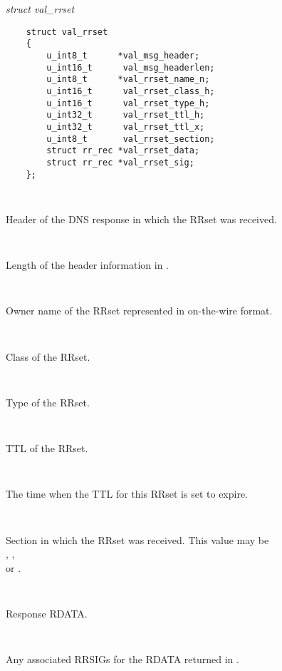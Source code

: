 \begin{description}

\item {\it struct val\_rrset}\verb" "

\begin{verbatim}
    struct val_rrset
    {
        u_int8_t      *val_msg_header;
        u_int16_t      val_msg_headerlen;
        u_int8_t      *val_rrset_name_n;
        u_int16_t      val_rrset_class_h;
        u_int16_t      val_rrset_type_h;
        u_int32_t      val_rrset_ttl_h;
        u_int32_t      val_rrset_ttl_x;
        u_int8_t       val_rrset_section;
        struct rr_rec *val_rrset_data;
        struct rr_rec *val_rrset_sig;
    };
\end{verbatim}

\begin{description}

\item {} \verb" "

Header of the DNS response in which the RRset was received.

\item {} \verb" "

Length of the header information in .

\item {} \verb" "

Owner name of the RRset represented in on-the-wire format.

\item {} \verb" "

Class of the RRset.

\item {} \verb" "

Type of the RRset.

\item {} \verb" "

TTL of the RRset.

\item {} \verb" "

The time when the TTL for this RRset is set to expire.

\item {} \verb" "

Section in which the RRset was received.  This value may be\\
, ,\\
or .

\item {} \verb" "

Response RDATA.

\item {} \verb" "

Any associated RRSIGs for the RDATA returned in .

\end{description}
\end{description}


